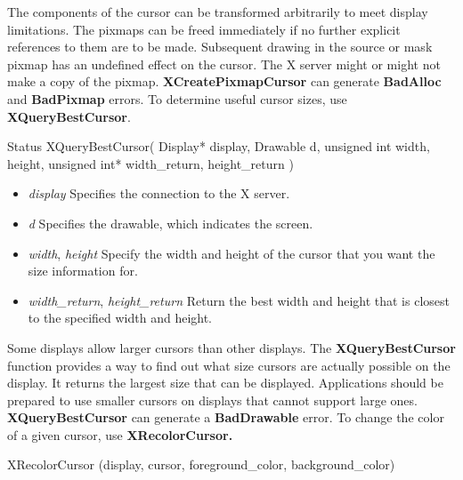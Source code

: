 \documentclass{report}
\begin{document}
\begin{itemize}
            \bigbreak \noindent 
            The components of the cursor can be transformed arbitrarily to meet display limitations. The pixmaps can be freed immediately if no further explicit references to them are to be made. Subsequent drawing in the source or mask pixmap has an undefined effect on the cursor. The X server might or might not make a copy of the pixmap.
            \bigbreak \noindent 
            \textbf{XCreatePixmapCursor} can generate \textbf{BadAlloc} and \textbf{BadPixmap} errors.
            \bigbreak \noindent 
            To determine useful cursor sizes, use \textbf{XQueryBestCursor}.
            \begin{cppcode}
                Status XQueryBestCursor(
                    Display* display,
                    Drawable d,
                    unsigned int width, height,
                    unsigned int* width_return, height_return
                )
            \end{cppcode}
            \bigbreak \noindent
            \begin{itemize}
                \item \textit{display} Specifies the connection to the X server.
                \item \textit{d} Specifies the drawable, which indicates the screen.
                \item \textit{width}, \textit{height} Specify the width and height of the cursor that you want the size information for.
                \item \textit{width\_return}, \textit{height\_return} Return the best width and height that is closest to the specified width and height.
            \end{itemize}
            Some displays allow larger cursors than other displays. The \textbf{XQueryBestCursor} function provides a way to find out what size cursors are actually possible on the display. It returns the largest size that can be displayed. Applications should be prepared to use smaller cursors on displays that cannot support large ones.
            \bigbreak \noindent 
            \textbf{XQueryBestCursor} can generate a \textbf{BadDrawable} error.
            \bigbreak \noindent 
            To change the color of a given cursor, use \textbf{XRecolorCursor.}
            \bigbreak \noindent 
            \begin{cppcode}
                XRecolorCursor (display, cursor, foreground_color, background_color)
            \end{cppcode}
            \bigbreak \noindent

\end{itemize}
\end{document}
